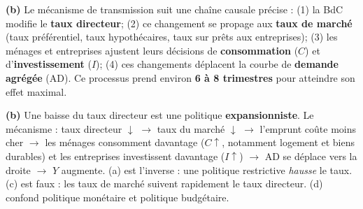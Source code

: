 \begin{reponse}
\textbf{(b)} Le mécanisme de transmission suit une chaîne causale précise : (1) la BdC modifie le \textbf{taux directeur}; (2) ce changement se propage aux \textbf{taux de marché} (taux préférentiel, taux hypothécaires, taux sur prêts aux entreprises); (3) les ménages et entreprises ajustent leurs décisions de \textbf{consommation} ($C$) et d'\textbf{investissement} ($I$); (4) ces changements déplacent la courbe de \textbf{demande agrégée} (AD). Ce processus prend environ \textbf{6 à 8 trimestres} pour atteindre son effet maximal.
\end{reponse}


\begin{reponse}
\textbf{(b)} Une baisse du taux directeur est une politique \textbf{expansionniste}. Le mécanisme : taux directeur $\downarrow$ $\to$ taux du marché $\downarrow$ $\to$ l'emprunt coûte moins cher $\to$ les ménages consomment davantage ($C \uparrow$, notamment logement et biens durables) et les entreprises investissent davantage ($I \uparrow$) $\to$ AD se déplace vers la droite $\to$ $Y$ augmente. (a) est l'inverse : une politique restrictive \textit{hausse} le taux. (c) est faux : les taux de marché suivent rapidement le taux directeur. (d) confond politique monétaire et politique budgétaire.
\end{reponse}



